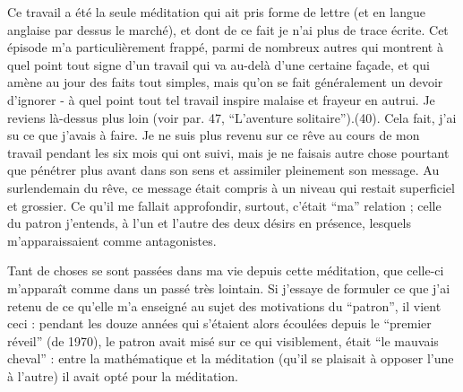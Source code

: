 {Ce travail a été la seule méditation qui ait pris forme de lettre (et en langue anglaise par dessus le marché), et dont de ce fait je n'ai plus de trace écrite. Cet épisode m'a particulièrement frappé, parmi de nombreux autres qui montrent à quel point tout signe d'un travail qui va au-delà d'une certaine façade, et qui amène au jour des faits tout simples, mais qu'on se fait généralement un devoir d'ignorer - à quel point tout tel travail inspire malaise et frayeur en autrui. Je reviens là-dessus plus loin (voir par. 47, ``L'aventure solitaire'').}(40). Cela fait, j'ai su ce que j'avais à faire. Je ne suis plus revenu sur ce rêve au cours de mon travail pendant les six mois qui ont suivi, mais je ne faisais autre chose pourtant que pénétrer plus avant dans son sens et assimiler pleinement son message. Au surlendemain du rêve, ce message était compris à un niveau qui restait superficiel et grossier. Ce qu'il me fallait approfondir, surtout, c'était ``ma'' relation ; celle du patron j'entends, à l'un et l'autre des deux désirs en présence, lesquels m'apparaissaient comme antagonistes.

Tant de choses se sont passées dans ma vie depuis cette méditation, que celle-ci m'apparaît comme dans un passé très lointain. Si j'essaye de formuler ce que j'ai retenu de ce qu'elle m'a enseigné au sujet des motivations du ``patron'', il vient ceci : pendant les douze années qui s'étaient alors écoulées depuis le ``premier réveil'' (de 1970), le patron avait misé sur ce qui visiblement, était ``le mauvais cheval'' : entre la mathématique et la méditation (qu'il se plaisait à opposer l'une à l'autre) il avait opté pour la méditation.

